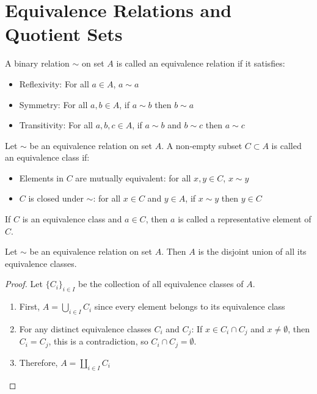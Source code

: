 \documentclass[11pt,lang=en]{elegantbook}
\begin{document}
\section{Equivalence Relations and Quotient Sets}

\begin{definition}
  A binary relation $\sim$ on set $A$ is called an equivalence relation if it satisfies:
  \begin{itemize}
    \item Reflexivity: For all $a \in A$, $a \sim a$
    \item Symmetry: For all $a,b \in A$, if $a \sim b$ then $b \sim a$
    \item Transitivity: For all $a,b,c \in A$, if $a \sim b$ and $b \sim c$ then $a \sim c$
  \end{itemize}
\end{definition}

\begin{definition}
  Let $\sim$ be an equivalence relation on set $A$. A non-empty subset $C \subset A$ is called an equivalence class if:
  \begin{itemize}
    \item Elements in $C$ are mutually equivalent: for all $x,y \in C$, $x \sim y$
    \item $C$ is closed under $\sim$: for all $x \in C$ and $y \in A$, if $x \sim y$ then $y \in C$
  \end{itemize}
  If $C$ is an equivalence class and $a \in C$, then $a$ is called a representative element of $C$.
\end{definition}

\begin{proposition}
  Let $\sim$ be an equivalence relation on set $A$. Then $A$ is the disjoint union of all its equivalence classes.
\end{proposition}

\begin{proof}
  Let $\{C_i\}_{i \in I}$ be the collection of all equivalence classes of $A$.
  \begin{enumerate}
    \item First, $A = \bigcup_{i \in I} C_i$ since every element belongs to its equivalence class
    \item For any distinct equivalence classes $C_i$ and $C_j$:
      If $x \in C_i \cap C_j$ and $x\neq \emptyset $, then $C_i = C_j$, this is a contradiction, so $C_i \cap C_j = \emptyset$. 
    \item Therefore, $A = \coprod_{i \in I} C_i$
  \end{enumerate}
\end{proof}
\end{document}
